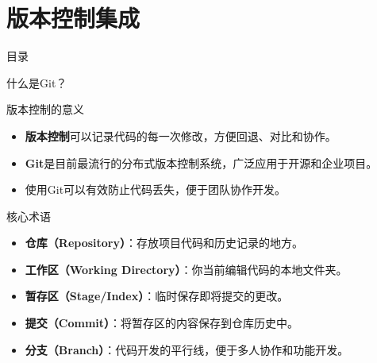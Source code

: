 \documentclass[UTF8,aspectratio=169]{beamer}
\begin{document}
\section{版本控制集成}
\begin{frame}{目录}
    \begin{multicols}{2}
        \tableofcontents[currentsection]
    \end{multicols}
\end{frame}

\begin{frame}{什么是Git？}
    \begin{ytublock}{版本控制的意义}
        \begin{itemize}
            \item \textbf{版本控制}可以记录代码的每一次修改，方便回退、对比和协作。
            \item \textbf{Git}是目前最流行的分布式版本控制系统，广泛应用于开源和企业项目。
            \item 使用Git可以有效防止代码丢失，便于团队协作开发。
        \end{itemize}
    \end{ytublock}
    \begin{ytublock}{核心术语}
        \begin{itemize}
            \item \textbf{仓库（Repository）}：存放项目代码和历史记录的地方。
            \item \textbf{工作区（Working Directory）}：你当前编辑代码的本地文件夹。
            \item \textbf{暂存区（Stage/Index）}：临时保存即将提交的更改。
            \item \textbf{提交（Commit）}：将暂存区的内容保存到仓库历史中。
            \item \textbf{分支（Branch）}：代码开发的平行线，便于多人协作和功能开发。
        \end{itemize}
    \end{ytublock}
\end{frame}
\end{document}
